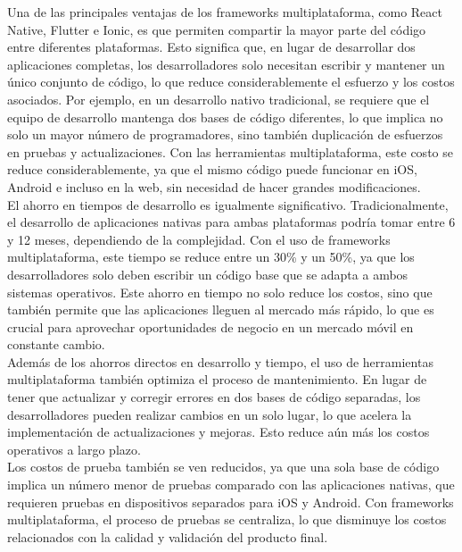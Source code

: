Una de las principales ventajas de los frameworks multiplataforma, como React Native, Flutter e Ionic,
es que permiten compartir la mayor parte del código entre diferentes plataformas. Esto significa que,
en lugar de desarrollar dos aplicaciones completas, los desarrolladores solo necesitan escribir y
mantener un único conjunto de código, lo que reduce considerablemente el esfuerzo y los costos asociados.
Por ejemplo, en un desarrollo nativo tradicional, se requiere que el equipo de desarrollo mantenga dos
bases de código diferentes, lo que implica no solo un mayor número de programadores, sino también
duplicación de esfuerzos en pruebas y actualizaciones. Con las herramientas multiplataforma, este
costo se reduce considerablemente, ya que el mismo código puede funcionar en iOS, Android e incluso
en la web, sin necesidad de hacer grandes modificaciones.\\

El ahorro en tiempos de desarrollo es igualmente significativo. Tradicionalmente, el desarrollo de
aplicaciones nativas para ambas plataformas podría tomar entre 6 y 12 meses, dependiendo de la
complejidad. Con el uso de frameworks multiplataforma, este tiempo se reduce entre un 30\% y un 50\%, ya
que los desarrolladores solo deben escribir un código base que se adapta a ambos sistemas operativos.
Este ahorro en tiempo no solo reduce los costos, sino que también permite que las aplicaciones lleguen
al mercado más rápido, lo que es crucial para aprovechar oportunidades de negocio en un mercado móvil
en constante cambio.\\

Además de los ahorros directos en desarrollo y tiempo, el uso de herramientas multiplataforma también
optimiza el proceso de mantenimiento. En lugar de tener que actualizar y corregir errores en dos bases
de código separadas, los desarrolladores pueden realizar cambios en un solo lugar, lo que acelera la
implementación de actualizaciones y mejoras. Esto reduce aún más los costos operativos a largo plazo.\\

Los costos de prueba también se ven reducidos, ya que una sola base de código implica un número menor
de pruebas comparado con las aplicaciones nativas, que requieren pruebas en dispositivos separados
para iOS y Android. Con frameworks multiplataforma, el proceso de pruebas se centraliza, lo que
disminuye los costos relacionados con la calidad y validación del producto final.\\

